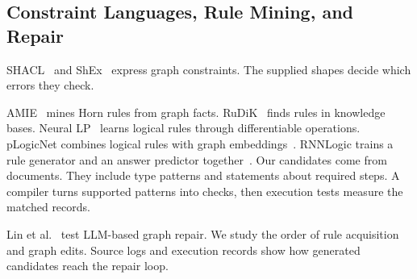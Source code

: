 \subsection{Constraint Languages, Rule Mining, and Repair}

SHACL~\cite{ref_knublauch2017} and ShEx~\cite{ref_prud2014} express graph
constraints. The supplied shapes decide which errors they check.

AMIE~\cite{ref_galarraga2013} mines Horn rules from graph facts.
RuDiK~\cite{ref_ortona2018} finds rules in knowledge bases.
Neural LP~\cite{ref_yang2017} learns logical rules through differentiable
operations. pLogicNet combines logical rules with graph
embeddings~\cite{ref_qu2019}. RNNLogic trains a rule generator and an
answer predictor together~\cite{ref_qu2021}.
Our candidates come from documents. They include type patterns
and statements about required steps. A compiler turns supported patterns
into checks, then execution tests measure the matched records.

Lin et al.~\cite{ref_lin2025} test LLM-based graph repair.
We study the order of rule acquisition and graph edits. Source logs and
execution records show how generated candidates reach the repair loop.
